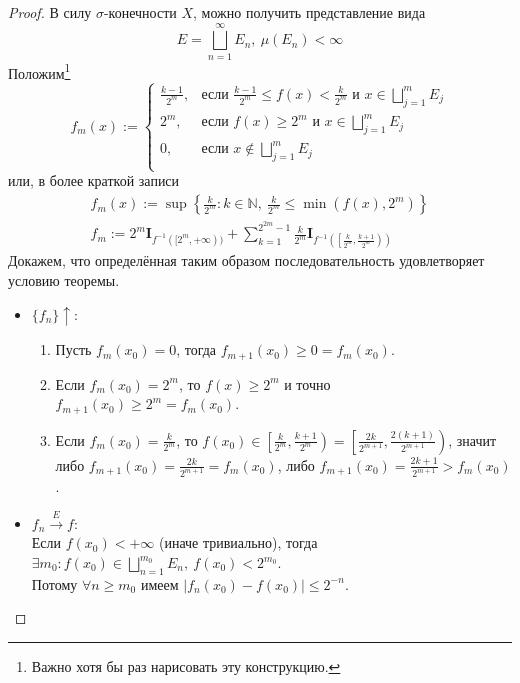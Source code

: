 \documentclass[11pt,a4paper]{report}
\def\Natural{\mathbb{N}}
\theoremstyle{definition}
\theoremstyle{definition}
\theoremstyle{definition}
\begin{document}
		\begin{proof}
			В силу $ \sigma $-конечности $ X $, можно получить представление вида 
			\[ 
				E = \bigsqcup\limits_{n=1}^{\infty} E_{n},\ \mu(E_{n}) < \infty
			\]
			Положим\footnote{Важно хотя бы раз нарисовать эту конструкцию.} 
			\[ f_{m}(x) := 
				\begin{cases} 
					\frac{k-1}{2^{m}}, & \text{если } \frac{k-1}{2^{m}} \le f(x) < \frac{k}{2^{m}} \text{ и } x \in \bigsqcup\limits_{j=1}^{m} E_{j}\\
					2^{m}, & \text{если } f(x) \ge 2^{m} \text{ и } x \in \bigsqcup\limits_{j=1}^{m} E_{j}\\
					0, & \text{если } x \not \in \bigsqcup\limits_{j=1}^{m} E_{j}\\
				\end{cases} 
			\]
			или, в более краткой записи
			\begin{gather*}
				f_{m}(x) := \sup \left \{ \frac{k}{2^{m}}: k \in \Natural,\ \frac{k}{2^{m}} \le \min(f(x), 2^{m}) \right \}\\
				f_{m} := 2^{m} \mathbf{I}_{f^{-1}([2^{m}, +\infty))} + \sum\limits_{k=1}^{2^{2m}-1} \frac{k}{2^{m}} \mathbf{I}_{f^{-1}\left (\left [\frac{k}{2^{m}}, \frac{k+1}{2^{m}}\right )\right )}
			\end{gather*}
			Докажем, что определённая таким образом последовательность удовлетворяет условию теоремы.
			\begin{itemize}
				\item $ \{f_{n}\} \uparrow $:
					\begin{enumerate}
						\item Пусть $ f_{m}(x_{0}) = 0 $, тогда $ f_{m+1}(x_{0}) \ge 0 = f_{m}(x_{0}) $.
						\item Если $ f_{m}(x_{0}) = 2^{m} $, то $ f(x) \ge 2^{m} $ и точно $ f_{m+1}(x_{0}) \ge 2^{m} = f_{m}(x_{0}) $.
						\item Если $ f_{m}(x_{0}) = \frac{k}{2^{m}} $, то $ f(x_{0}) \in \left[ \frac{k}{2^{m}}, \frac{k+1}{2^{m}} \right) = \left[ \frac{2k}{2^{m+1}}, \frac{2(k+1)}{2^{m+1}} \right) $, значит либо $ f_{m+1}(x_{0}) = \frac{2k}{2^{m+1}} = f_{m}(x_{0}) $, либо $ f_{m+1}(x_{0}) = \frac{2k+1}{2^{m+1}} > f_{m}(x_{0}) $.
					\end{enumerate}
				\item $ f_{n} \xrightarrow{E} f $:\\
				Если $ f(x_{0}) < +\infty $ (иначе тривиально), тогда $ \exists m_{0}: f(x_{0}) \in \bigsqcup\limits_{n=1}^{m_{0}} E_{n},\ f(x_{0}) < 2^{m_{0}} $.\\ 
				Потому $ \forall n \ge m_{0} $ имеем $ |f_{n}(x_{0}) - f(x_{0})| \le 2^{-n} $.
			\end{itemize}
		\end{proof}
\end{document}
